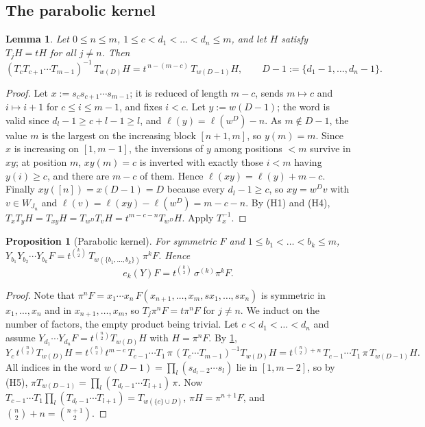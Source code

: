 \documentclass[11pt]{amsart}
\newtheorem{proposition}[theorem]{Proposition}
\newtheorem{lemma}[theorem]{Lemma}
\theoremstyle{definition}
\theoremstyle{remark}
\numberwithin{equation}{section}
\begin{document}
\subsection{The parabolic kernel}

\begin{lemma}\label{lem:KL}
Let $0\le n\le m$, $1\le c<d_1<\dots<d_n\le m$, and let $H$ satisfy $T_jH=tH$ for all $j\neq n$. Then
\[ (T_cT_{c+1}\cdots T_{m-1})^{-1}\,T_{w(D)}H=t^{\,n-(m-c)}\,T_{w(D-1)}H,\qquad D-1:=\{d_1-1,\dots,d_n-1\}. \]
\end{lemma}
\begin{proof}
Let $x:=s_cs_{c+1}\cdots s_{m-1}$; it is reduced of length $m-c$, sends $m\mapsto c$ and $i\mapsto i+1$ for $c\le i\le m-1$, and fixes $i<c$. Let $y:=w(D-1)$; the word is valid since $d_l-1\ge c+l-1\ge l$, and $\ell(y)=\ell(w^D)-n$. As $m\notin D-1$, the value $m$ is the largest on the increasing block $[n+1,m]$, so $y(m)=m$. Since $x$ is increasing on $[1,m-1]$, the inversions of $y$ among positions $<m$ survive in $xy$; at position $m$, $xy(m)=c$ is inverted with exactly those $i<m$ having $y(i)\ge c$, and there are $m-c$ of them. Hence $\ell(xy)=\ell(y)+m-c$. Finally $xy([n])=x(D-1)=D$ because every $d_l-1\ge c$, so $xy=w^Dv$ with $v\in W_{J_n}$ and $\ell(v)=\ell(xy)-\ell(w^D)=m-c-n$. By (H1) and (H4), $T_xT_yH=T_{xy}H=T_{w^D}T_vH=t^{m-c-n}T_{w^D}H$. Apply $T_x^{-1}$.
\end{proof}

\begin{proposition}[Parabolic kernel]\label{prop:Ak}
For symmetric $F$ and $1\le b_1<\dots<b_k\le m$, $Y_{b_1}Y_{b_2}\cdots Y_{b_k}F=t^{\binom k2}\,T_{w(\{b_1,\dots,b_k\})}\,\pi^kF$. Hence
\[ e_k(Y)F=t^{\binom k2}\,\sigma^{(k)}\pi^kF . \]
\end{proposition}
\begin{proof}
Note that $\pi^nF=x_1\cdots x_n\,F(x_{n+1},\dots,x_m,sx_1,\dots,sx_n)$ is symmetric in $x_1,\dots,x_n$ and in $x_{n+1},\dots,x_m$, so $T_j\pi^nF=t\pi^nF$ for $j\neq n$. We induct on the number of factors, the empty product being trivial. Let $c<d_1<\dots<d_n$ and assume $Y_{d_1}\cdots Y_{d_n}F=t^{\binom n2}T_{w(D)}H$ with $H=\pi^nF$. By \cref{lem:KL},
\[ Y_c\,t^{\binom n2}T_{w(D)}H=t^{\binom n2}t^{m-c}\,T_{c-1}\cdots T_1\,\pi\,(T_c\cdots T_{m-1})^{-1}T_{w(D)}H=t^{\binom n2+n}\,T_{c-1}\cdots T_1\,\pi\,T_{w(D-1)}H. \]
All indices in the word $w(D-1)=\prod_l(s_{d_l-2}\cdots s_l)$ lie in $[1,m-2]$, so by (H5), $\pi T_{w(D-1)}=\prod_l(T_{d_l-1}\cdots T_{l+1})\,\pi$. Now $T_{c-1}\cdots T_1\prod_l(T_{d_l-1}\cdots T_{l+1})=T_{w(\{c\}\cup D)}$, $\pi H=\pi^{n+1}F$, and $\binom n2+n=\binom{n+1}2$.
\end{proof}
\end{document}
